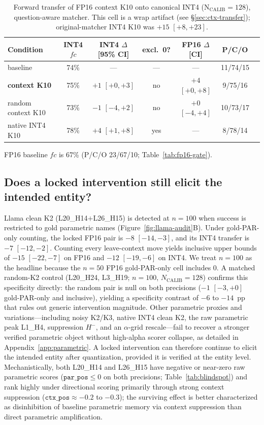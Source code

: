 \documentclass{article} %
\begin{document}
\begin{table}[t]
\caption{Forward transfer of FP16 context K10 onto canonical INT4 ($\mathrm{N_{CALIB}{=}128}$), question-aware matcher. This cell is a wrap artifact (see \S\ref{sec:ctx-transfer}); original-matcher INT4 K10 was $+15$ $[+8,+23]$.}
\label{tab:ctx-k10}
\centering
\footnotesize
\setlength{\tabcolsep}{2.5pt}
\begin{tabular}{lcccccc}
\toprule
Condition & INT4 $fc$ & INT4 $\Delta$ [95\% CI] & excl.\ 0? & FP16 $\Delta$ [CI] & P/C/O \\
\midrule
baseline & 74\% & --- & --- & --- & 11/74/15 \\
\textbf{context K10} & 75\% & $+1$ $[+0,+3]$ & no & $+4$ $[+0,+8]$ & 9/75/16 \\
random context K10 & 73\% & $-1$ $[-4,+2]$ & no & $+0$ $[-4,+4]$ & 10/73/17 \\
native INT4 K10 & 78\% & $+4$ $[+1,+8]$ & yes & --- & 8/78/14 \\
\bottomrule
\end{tabular}
\par\vspace{1pt}\raggedright\tiny FP16 baseline $fc$ is 67\% (P/C/O 23/67/10; Table~\ref{tab:fp16-gate}).
\end{table}

\subsection{Does a locked intervention still elicit the intended entity?}
\label{sec:parametric}

Llama clean K2 (L20\_H14$+$L26\_H15) is detected at $n{=}100$ when success is restricted to gold parametric names (Figure~\ref{fig:llama-audit}B). Under gold-PAR-only counting, the locked FP16 pair is $-8$ $[-14,-3]$, and its INT4 transfer is $-7$ $[-12,-2]$. Counting every leave-context move yields inclusive upper bounds of $-15$ $[-22,-7]$ on FP16 and $-12$ $[-19,-6]$ on INT4. We treat $n{=}100$ as the headline because the $n{=}50$ FP16 gold-PAR-only cell includes 0. A matched random-K2 control (L20\_H24, L3\_H19; $n{=}100$, $N_{\mathrm{CALIB}}{=}128$) confirms this specificity directly: the random pair is null on both precisions ($-1$ $[-3, +0]$ gold-PAR-only and inclusive), yielding a specificity contrast of $-6$ to $-14$~pp that rules out generic intervention magnitude. Other parametric proxies and variations---including noisy K2/K3, native INT4 clean K2, the raw parametric peak L1\_H4, suppression $H^{-}$, and an $\alpha$-grid rescale---fail to recover a stronger verified parametric object without high-alpha scorer collapse, as detailed in Appendix~\ref{app:parametric}. A locked intervention can therefore continue to elicit the intended entity after quantization, provided it is verified at the entity level. Mechanistically, both L20\_H14 and L26\_H15 have negative or near-zero raw parametric scores ($\texttt{par\_pos} \le 0$ on both precisions; Table~\ref{tab:blindspot}) and rank highly under directional scoring primarily through strong context suppression ($\texttt{ctx\_pos} \approx -0.2$ to $-0.3$); the surviving effect is better characterized as disinhibition of baseline parametric memory via context suppression than direct parametric amplification.
\end{document}
